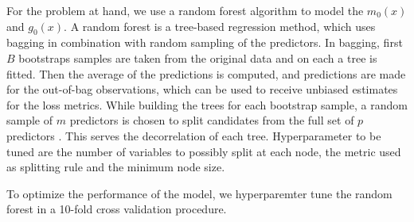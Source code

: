 For the problem at hand, we use a random forest algorithm to model the $m_0(x)$ and $g_0(x)$. A random forest is a
tree-based regression method, which uses bagging in combination with random sampling of the predictors. In bagging, first
$B$ bootstraps samples are taken from the original data and on each a tree is fitted. Then the average of the predictions
is computed, and predictions are made for the out-of-bag observations, which can be used to receive unbiased
estimates for the loss metrics. While building the trees for each bootstrap sample, a random sample of $m$ predictors is
chosen to split candidates from the full set of $p$ predictors \cite[~p. 319]{james2013}. This serves the
decorrelation of each tree. Hyperparameter to be tuned are the number of variables to possibly split at
each node, the metric used as splitting rule and the minimum node size.

To optimize the performance of the model, we hyperparemter tune the random forest in a 10-fold cross validation procedure.


